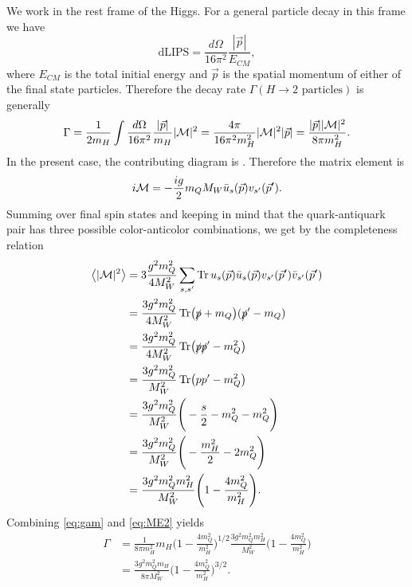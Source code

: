 We work in the rest frame of the Higgs. For a general particle decay in this
frame we have \cite[p.107]{peskin_introduction_1995}
\begin{equation}
  \text{dLIPS}=\frac{d\Omega}{16\pi^2}\frac{|\vec{p}|}{E_{CM}},
\end{equation}
where $E_{CM}$ is the total initial energy and $\vec{p}$ is the spatial
momentum of either of the final state particles. Therefore the decay rate
$\Gamma(H\to\text{2 particles})$ is generally
\begin{equation}
  \label{eq:gam}
  \Gamma=\frac{1}{2m_H}\int\frac{d\Omega}{16\pi^2}
             \frac{|\vec{p}|}{m_H}|\mathcal{M}|^2
        =\frac{4\pi}{16\pi^2 m_H^2}|\mathcal{M}|^2|\vec{p}|
        =\frac{|\vec{p}||\mathcal{M}|^2}{8\pi m_H^2}.
\end{equation}
In the present case, the contributing diagram is . Therefore the matrix
element is
\begin{equation}
  i\mathcal{M}=-\frac{ig}{2}{m_Q}{M_W}\bar{u}_s(\vec{p})v_{s'}(\vec{p}').
\end{equation}
Summing over final spin states and keeping in mind that the quark-antiquark
pair has three possible color-anticolor combinations, we get by the
completeness relation
\begin{equation}
  \label{eq:ME2}
  \begin{aligned}
    \left< |\mathcal{M}|^2 \right>&=3\frac{g^2 m_Q^2}{4M_W^2}\sum\limits_{s,s'}
      \Tr u_s(\vec{p})\bar{u}_s(\vec{p})
          v_{s'}(\vec{p}')\bar{v}_{s'}(\vec{p}') \\
    &=\frac{3g^2 m_Q^2}{4M_W^2}\Tr(\slashed{p}+m_Q)(\slashed{p}'-m_Q) \\
    &=\frac{3g^2 m_Q^2}{4M_W^2}\Tr(\slashed{p}\slashed{p}'-m_Q^2) \\
    &=\frac{3g^2 m_Q^2}{M_W^2}\Tr(pp'-m_Q^2) \\
    &=\frac{3g^2 m_Q^2}{M_W^2}\Bigg(-\frac{s}{2}-m_Q^2-m_Q^2\Bigg) \\
    &=\frac{3g^2 m_Q^2}{M_W^2}\Bigg(-\frac{m_H^2}{2}-2m_Q^2\Bigg) \\
    &=\frac{3g^2 m_Q^2 m_H^2}{M_W^2}\Bigg(1-\frac{4m_Q^2}{m_H^2}\Bigg).
  \end{aligned}
\end{equation}
Combining \eqref{eq:gam} and \eqref{eq:ME2} yields
\begin{equation}
  \label{eq:gamQ}
  \begin{aligned}
    \Gamma&=\frac{1}{8\pi m_H^2}{m_H}\Bigg(1-\frac{4m_Q^2}{m_H^2}\Bigg)^{1/2}
            \frac{3g^2m_Q^2m_H^2}{M_W^2}\Bigg(1-\frac{4m_Q^2}{m_H^2}\Bigg)\\
          &=\frac{3g^2m_Q^2m_H}{8\pi M_W^2}
               \Bigg(1-\frac{4m_Q^2}{m_H^2}\Bigg)^{3/2}.
  \end{aligned}
\end{equation}

